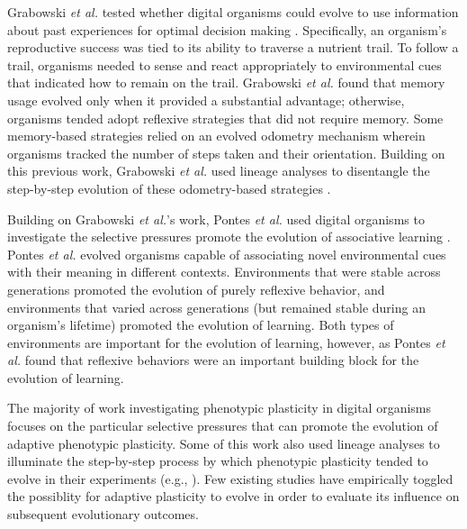 Grabowski \textit{et al.} tested whether digital organisms could evolve to use information about past experiences for optimal decision making \citep{grabowski2010early}. 
Specifically, an organism's reproductive success was tied to its ability to traverse a nutrient trail.
To follow a trail, organisms needed to sense and react appropriately to environmental cues that indicated how to remain on the trail.
Grabowski \textit{et al.} found that memory usage evolved only when it provided a substantial advantage; otherwise, organisms tended adopt reflexive strategies that did not require memory.
Some memory-based strategies relied on an evolved odometry mechanism wherein organisms tracked the number of steps taken and their orientation.
Building on this previous work, Grabowski \textit{et al.} used lineage analyses to disentangle the step-by-step evolution of these odometry-based strategies \citep{grabowski_case_2013}. 

Building on Grabowski \textit{et al.}'s work, Pontes \textit{et al.} used digital organisms to investigate the selective pressures promote the evolution of associative learning \citep{pontes_investigations_2017,pontes_evolutionary_2019}.
Pontes \textit{et al.} evolved organisms capable of associating novel environmental cues with their meaning in different contexts.
Environments that were stable across generations promoted the evolution of purely reflexive behavior, and environments that varied across generations (but remained stable during an organism's lifetime) promoted the evolution of learning.
Both types of environments are important for the evolution of learning, however, as Pontes \textit{et al.} found that reflexive behaviors were an important building block for the evolution of learning.  


The majority of work investigating phenotypic plasticity in digital organisms focuses on the particular selective pressures that can promote the evolution of adaptive phenotypic plasticity.
Some of this work also used lineage analyses to illuminate the step-by-step process by which phenotypic plasticity tended to evolve in their experiments (e.g., \citealt{grabowski_case_2013,goldsby_evolutionary_2014,pontes_evolutionary_2019}). 
Few existing studies have empirically toggled the possiblity for adaptive plasticity to evolve in order to evaluate its influence on subsequent evolutionary outcomes.


